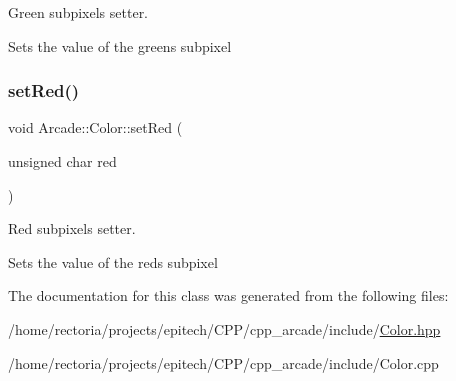 Green subpixel\textquotesingle{}s setter. 

Sets the value of the green\textquotesingle{}s subpixel \mbox{\label{class_arcade_1_1_color_aec0bb036be18f1fbd746787ae7622914}} 
\subsubsection{\texorpdfstring{set\+Red()}{setRed()}}
{\footnotesize\ttfamily void Arcade\+::\+Color\+::set\+Red (\begin{DoxyParamCaption}\item[{unsigned char}]{red }\end{DoxyParamCaption})}



Red subpixel\textquotesingle{}s setter. 

Sets the value of the red\textquotesingle{}s subpixel 

The documentation for this class was generated from the following files\+:\begin{DoxyCompactItemize}
\item 
/home/rectoria/projects/epitech/\+C\+P\+P/cpp\+\_\+arcade/include/\hyperlink{_color_8hpp}{Color.\+hpp}\item 
/home/rectoria/projects/epitech/\+C\+P\+P/cpp\+\_\+arcade/include/Color.\+cpp\end{DoxyCompactItemize}
